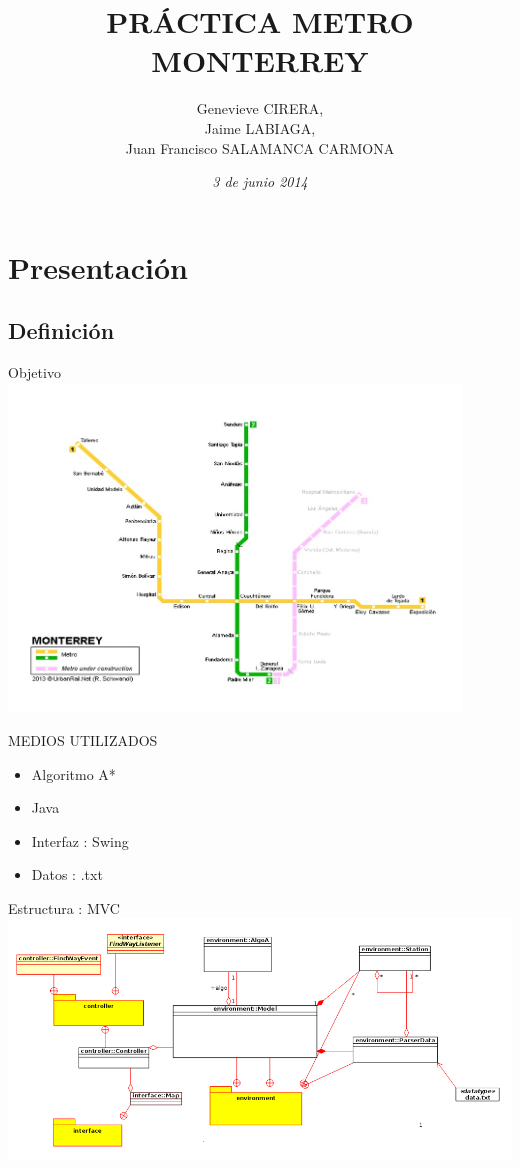 \documentclass[11pt]{beamer}
\title{PRÁCTICA METRO MONTERREY}
\author{Genevieve CIRERA, \\Jaime LABIAGA, \\Juan Francisco SALAMANCA CARMONA}
\date{\textit{3 de junio 2014}}
\begin{document}
\begin{frame}
\titlepage
\end{frame}


\section{Presentación}

\subsection*{Definici\'on}
\begin{frame}{Objetivo}
	\includegraphics[width=0.9\textwidth]{images/MapaMetroMonterrey.jpg}
\end{frame}

\begin{frame}{MEDIOS UTILIZADOS}
\begin{itemize}
\item Algoritmo A*
\item Java
\item Interfaz : Swing
\item Datos : .txt
\end{itemize}
\end{frame}

\begin{frame}{Estructura : MVC}
\includegraphics[width=1.1\textwidth]{images/classDiagram.png}
\end{frame}
\end{document}

